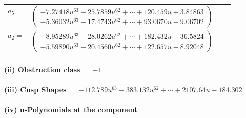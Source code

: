 \documentclass[1p]{elsarticle_modified}
\theoremstyle{definition}
\begin{document}
\begin{tabular}{m{7pt} m{180pt} m{7pt} m{180pt} }
\flushright $a_{5}=$&$\begin{pmatrix}-7.27418 u^{63}-25.7859 u^{62}+\cdots+120.459 u+3.84863\\-5.36032 u^{63}-17.4743 u^{62}+\cdots+93.0670 u-9.06702\end{pmatrix}$ \\
\flushright $a_{2}=$&$\begin{pmatrix}-8.95289 u^{63}-28.0262 u^{62}+\cdots+182.432 u-36.5824\\-5.59890 u^{63}-20.4560 u^{62}+\cdots+122.657 u-8.92048\end{pmatrix}$\\&\end{tabular}
\flushleft \textbf{(ii) Obstruction class $= -1$}\\~\\
\flushleft \textbf{(iii) Cusp Shapes $= -112.789 u^{63}-383.132 u^{62}+\cdots+2107.64 u-184.302$}\\~\\
\newpage\renewcommand{\arraystretch}{1}
\flushleft \textbf{(iv) u-Polynomials at the component}\newline \\
\end{document}
